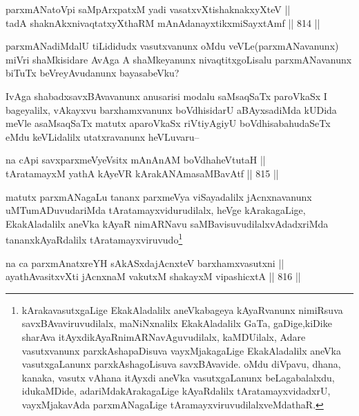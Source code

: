 \begin{shl}
parxmANatoV\s pi saMpArxpatxM yadi vasatxvXtishaknakxyXteV || \\
tadA shaknAkxnivaqtatxyXthaRM mAnAdanayxtikxmiSayxtAmf \hfill || 814 ||  
\end{shl}

\begin{artha}
parxmANadiMdalU tiLididudx vasutxvanunx oMdu veVLe(parxmANavanunx) miVri shaMkisidare AvAga A shaMkeyanunx nivaqtitxgoLisalu parxmANavanunx biTuTx beVreyAvudanunx bayasabeVku?
\end{artha}


\begin{artha}
IvAga shabadxsavxBAvavanunx anusarisi modalu saMsaqSaTx paroVkaSx I bageyalilx, vAkayxvu barxhamxvanunx boVdhisidarU aBAyxsadiMda kUDida meVle asaMsaqSaTx matutx aparoVkaSx riVtiyAgiyU boVdhisabahudaSeTx eMdu keVLidalilx utatxravanunx heVLuvaru{\rm --}
\end{artha}

\begin{shl}
na cApi savxparxmeVyeV\s sitx mAnAnAM boVdhaheVtutaH || \\
tAratamayxM yathA kAyeVR kArakANAmasaMBavAtf \hfill || 815 ||  
\end{shl}

\begin{artha}
matutx parxmANagaLu tananx parxmeVya viSayadalilx jAcnxnavanunx uMTumADuvudariMda tAratamayxvidurudilalx, heVge kArakagaLige, EkakAladalilx aneVka kAyaR nimARNavu saMBavisuvudilalxvAdadxriMda tananxkAyaRdalilx tAratamayxviruvudo\footnote{kArakavasutxgaLige EkakAladalilx aneVkabageya kAyaRvanunx nimiRsuva savxBAvaviruvudilalx, maNiNxnalilx EkakAladalilx GaTa, gaDige,kiDike sharAva itAyxdikAyaRnimARNavAguvudilalx, kaMDUilalx, Adare vasutxvanunx parxkAshapaDisuva vayxMjakagaLige EkakAladalilx aneVka vasutxgaLanunx parxkAshagoLisuva savxBAvavide. oMdu diVpavu, dhana, kanaka, vasutx vAhana itAyxdi aneVka vasutxgaLanunx beLagabalalxdu, idukaMDide, adariMdakArakagaLige kAyaRdalilx tAratamayxvidadxrU, vayxMjakavAda parxmANagaLige tAramayxviruvudilalxveMdathaR.}
\end{artha}

\begin{shl}
na ca parxmAnatxreYH sAkASxdajAcnxteV barxhamxvasutxni || \\
ayathAvasitxvXti jAcnxnaM vakutxM shakayxM vipashicxtA \hfill || 816 ||  
\end{shl}

